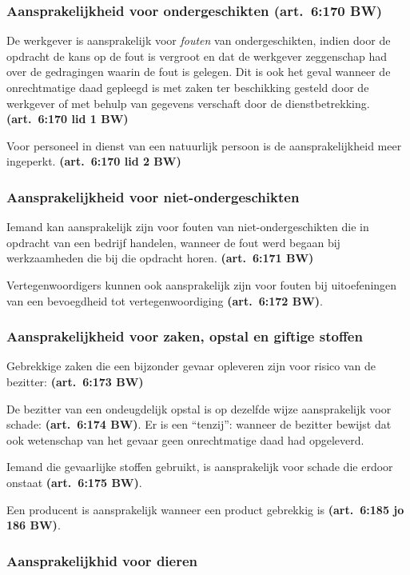 \documentclass[a4paper]{article}
\newcommand{\art}[1]{\textbf{(art.~#1 BW)}\xspace}
\begin{document}
\subsubsection{Aansprakelijkheid voor ondergeschikten \art{6:170}}

De werkgever is aansprakelijk voor \emph{fouten} van ondergeschikten, indien
door de opdracht de kans op de fout is vergroot en dat de werkgever
zeggenschap had over de gedragingen waarin de fout is gelegen. Dit is ook het
geval wanneer de onrechtmatige daad gepleegd is met zaken ter beschikking
gesteld door de werkgever of met behulp van gegevens verschaft door de
dienstbetrekking. \art{6:170 lid 1}

Voor personeel in dienst van een natuurlijk persoon is de aansprakelijkheid
meer ingeperkt. \art{6:170 lid 2}

\subsubsection{Aansprakelijkheid voor niet-ondergeschikten}

Iemand kan aansprakelijk zijn voor fouten van niet-ondergeschikten die in
opdracht van een bedrijf handelen, wanneer de fout werd begaan bij
werkzaamheden die bij die opdracht horen. \art{6:171}

Vertegenwoordigers kunnen ook aansprakelijk zijn voor fouten bij uitoefeningen
van een bevoegdheid tot vertegenwoordiging \art{6:172}.

\subsubsection{Aansprakelijkheid voor zaken, opstal en giftige stoffen}

Gebrekkige zaken die een bijzonder gevaar opleveren zijn voor risico van de
bezitter: \art{6:173}

De bezitter van een ondeugdelijk opstal is op dezelfde wijze aansprakelijk
voor schade: \art{6:174}. Er is een ``tenzij'': wanneer de bezitter bewijst
dat ook wetenschap van het gevaar geen onrechtmatige daad had opgeleverd.

Iemand die gevaarlijke stoffen gebruikt, is aansprakelijk voor schade die
erdoor onstaat \art{6:175}.

Een producent is aansprakelijk wanneer een product gebrekkig is \art{6:185 jo
186}.

\subsubsection{Aansprakelijkhid voor dieren}
\end{document}
